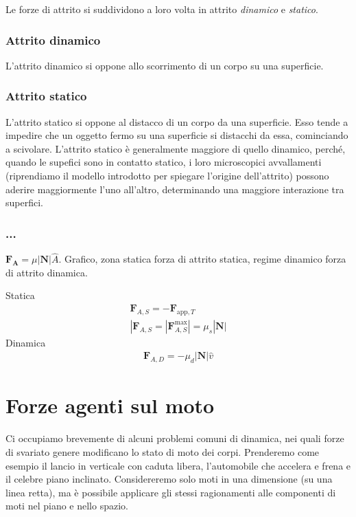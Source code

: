 Le forze di attrito si suddividono a loro volta in attrito \textit{dinamico} e
\textit{statico}.

\subsubsection*{Attrito dinamico}
L'attrito dinamico si oppone allo scorrimento di un corpo su una superficie.

\subsubsection*{Attrito statico}
L'attrito statico si oppone al distacco di un corpo da una superficie. Esso tende
a impedire che un oggetto fermo su una superficie si distacchi da essa, cominciando
a scivolare. L'attrito statico è generalmente maggiore di quello dinamico, perché,
quando le supefici sono in contatto statico, i loro microscopici avvallamenti
(riprendiamo il modello introdotto per spiegare l'origine dell'attrito)
possono aderire maggiormente l'uno all'altro, determinando una maggiore
interazione tra superfici.

\subsubsection*{...}
$\mathbf{F_A} = \mu|\mathbf{N}|\hat{A}$. Grafico, zona statica
forza di attrito statica, regime dinamico forza di attrito dinamica.

Statica
\begin{align}
    \mathbf{F}_{A,S} = -\mathbf{F}_{\text{app}, T}\\
    |\mathbf{F}_{A,S} = |\mathbf{F}_{A,S}^\text{max}| = \mu_s|\mathbf{N}|
\end{align}
Dinamica
\begin{align}
    \mathbf{F}_{A,D} = -\mu_d|\mathbf{N}|\hat{v}
\end{align}



\section{Forze agenti sul moto}
Ci occupiamo brevemente di alcuni problemi comuni di dinamica, nei
quali forze di svariato genere modificano lo stato di moto dei corpi.
Prenderemo come esempio il lancio in verticale con caduta libera,
l'automobile che accelera e frena e il celebre piano inclinato.
Considereremo solo moti in una dimensione (su una linea retta), ma è
possibile applicare gli stessi ragionamenti alle componenti di moti
nel piano e nello spazio.

